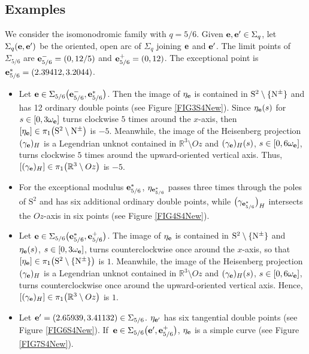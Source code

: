 \documentclass[pdftex]{sigma}
\def\rS{{\mathrm S}}
\def\gam{\gamma} %
\def\R{\mathbb R}
\newcommand\be{{\bf e}}
\numberwithin{equation}{section}
\begin{document}
\subsection*{Examples} We consider the isomonodromic family with $q=5/6$.
Given $\be,\be'\in \Sigma_q$, let $ \Sigma_q(\be,\be')$ be the oriented, open arc of $\Sigma_q$ joining $\be$ and $\be'$. The limit points of $\Sigma_{5/6}$ are $\be^-_{5/6}=(0,12/5)$ and $\be^+_{5/6}=(0,12)$. The exceptional point is $\be_{5/6}^*=(2.39412,3.2044)$.
\begin{itemize}\itemsep=0pt
\item Let $\be\in \Sigma_{5/6}\bigl(\be^-_{5/6},\be^*_{5/6}\bigr)$. Then the image of $\eta_{\be}$ is contained in $ \rS^2\setminus \{{\rm N}^{\pm}\}$ and has 12 ordinary double points (see Figure \ref{FIG3S4New}). Since $\eta_{\be}(s)$ for $s\in [0,3\omega_{\be}]$ turns clockwise $5$ times around the $x$-axis, then $[\eta_{\be}]\in \pi_1\bigl(\rS^2\setminus {\rm N}^{\pm}\bigr)$ is $-5$. Meanwhile, the image of the Heisenberg projection $(\gam_{\be})_H$ is a Legendrian unknot contained in $\R^3\setminus Oz$ and $(\gam_{\be})_H(s)$, $s\in [0,6\omega_{\be}]$, turns clockwise $5$ times around the upward-oriented vertical axis. Thus, $[(\gam_{\be})_H]\in \pi_1\bigl(\R^3\setminus Oz\bigr)$ is $-5$.

\item For the exceptional modulus $\be^*_{5/6}$, $\eta_{\be^*_{5/6}}$ passes three times through the poles of $\rS^2$ and has six additional ordinary double points, while
$\bigl(\gam_{\be^*_{5/6}}\bigr)_H$ intersects the $Oz$-axis in six points (see Figure \ref{FIG4S4New}).

\item Let $\be\in \Sigma_{5/6}\bigl(\be^*_{5/6},\be^+_{5/6}\bigr)$. The image of
$\eta_{\be}$ is contained in $\rS^2\setminus \{{\rm N}^{\pm}\}$ and $\eta_{\be}(s)$, $s\in [0,3\omega_{\be}]$, turns counterclockwise once around the $x$-axis, so that $[\eta_{\be}]\in \pi_1\bigl(\rS^2\setminus \{{\rm N}^{\pm}\}\bigr)$ is $1$.
Meanwhile, the image of the Heisenberg projection $(\gam_{\be})_H$ is a Legendrian unknot
contained in $\R^3\setminus Oz$ and $(\gam_{\be})_H(s)$, $s\in [0,6\omega_{\be}]$, turns counterclockwise once around the upward-oriented vertical axis. Hence, $[(\gam_{\be})_H]\in \pi_1\bigl(\R^3\setminus Oz\bigr)$ is $1$.

\item
Let $\be'=(2.65939, 3.41132)\in \Sigma_{5/6}$. $\eta_{\be'}$ has six tangential double points (see Figure \ref{FIG6S4New}).
 If~$\be\in \Sigma_{5/6}\bigl(\be',\be^+_{5/6}\bigr)$, $\eta_\be$ is a simple curve (see Figure \ref{FIG7S4New}).


\end{itemize}
\end{document}
